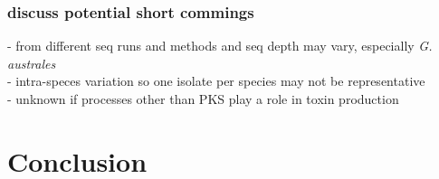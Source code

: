 \documentclass[12pt]{article}
\begin{document}
\subsubsection*{discuss potential short commings} 
- from different seq runs and methods and seq depth may vary, especially \textit{G. australes} \\
- intra-speces variation so one isolate per species may not be representative \\
- unknown if processes other than PKS play a role in toxin production

\section*{Conclusion}


\newpage


\end{document}
